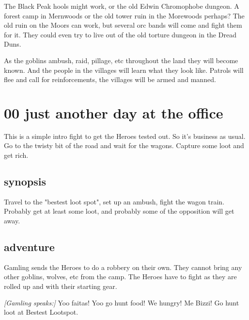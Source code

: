 The Black Peak hools might work, or the old Edwin Chromophobe dungeon. A forest camp in Mernwoods or the old tower ruin in the Morewoods perhaps? The old ruin on the Moors can work, but several orc bands will come and fight them for it. They could even try to live out of the old torture dungeon in the Dread Duns.

As the goblins ambush, raid, pillage, etc throughout the land they will become known. And the people in the villages will learn what they look like.  Patrols will flee and call for reinforcements, the villages will be armed and manned.




\newpage
\section*{00 just another day at the office}

This is a simple intro fight to get the Heroes tested out. So it's business as usual. Go to the twisty bit of the road and wait for the wagons. Capture some loot and get rich.


\subsection*{synopsis}

Travel to the "bestest loot spot", set up an ambush, fight the wagon train. Probably get at least some loot, and probably some of the opposition will get away.


\subsection*{adventure}

Gamling sends the Heroes to do a robbery on their own. They cannot bring any other goblins, wolves, etc from the camp. The Heroes have to fight as they are rolled up and with their starting gear.

\begin{readoutloud}
\emph{[Gamling speaks:]}
Yoo faitas! Yoo go hunt food! We hungry! Me Bizzi! Go hunt loot at Bestest Lootspot.
\end{readoutloud}

